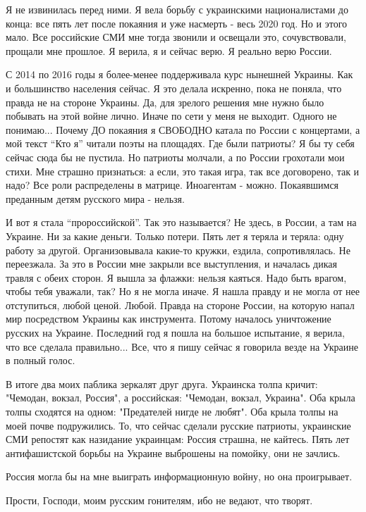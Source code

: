 Я не извинилась перед ними. Я вела борьбу с украинскими националистами до
конца: все пять лет после покаяния и уже насмерть - весь 2020 год. Но и этого
мало. Все российские СМИ мне тогда звонили и освещали это, сочувствовали,
прощали мне прошлое. Я верила, я и сейчас верю. Я реально верю России.

С 2014 по 2016 годы я более-менее поддерживала курс нынешней Украины. Как и
большинство населения сейчас. Я это делала искренно, пока не поняла, что правда
не на стороне Украины. Да, для зрелого решения мне нужно было побывать на этой
войне лично. Иначе по сети у меня не выходит. Одного не понимаю... Почему ДО
покаяния я СВОБОДНО катала по России с концертами, а мой текст \enquote{Кто я} читали
поэты на площадях. Где были патриоты? Я бы ту себя сейчас сюда бы не пустила.
Но патриоты молчали, а по России грохотали мои стихи. Мне страшно признаться: а
если, это такая игра, так все договорено, так и надо? Все роли распределены в
матрице. Иноагентам - можно. Покаявшимся преданным детям русского мира -
нельзя.

И вот я стала \enquote{пророссийской}. Так это называется? Не здесь, в России, а там на
Украине. Ни за какие деньги. Только потери. Пять лет я теряла и теряла: одну
работу за другой. Организовывала какие-то кружки, ездила, сопротивлялась. Не
переезжала. За это в России мне закрыли все выступления, и началась дикая
травля с обеих сторон. Я вышла за флажки: нельзя каяться. Надо быть врагом,
чтобы тебя уважали, так? Но я не могла иначе. Я нашла правду и не могла от нее
отступиться, любой ценой. Любой. Правда на стороне России, на которую напал мир
посредством Украины как инструмента. Потому началось уничтожение русских на
Украине. Последний год я пошла на большое испытание, я верила, что все сделала
правильно... Все, что я пишу сейчас я говорила везде на Украине в полный голос.

В итоге два моих паблика зеркалят друг друга. Украинска толпа кричит: "Чемодан,
вокзал, Россия", а российская: "Чемодан, вокзал, Украина". Оба крыла толпы
сходятся на одном: "Предателей нигде не любят". Оба крыла толпы на моей почве
подружились. То, что сейчас сделали русские патриоты, украинские СМИ репостят
как назидание украинцам: Россия страшна, не кайтесь. Пять лет антифашистской
борьбы на Украине выброшены на помойку, они не зачлись.

Россия могла бы на мне выиграть информационную войну, но она проигрывает.

Прости, Господи, моим русским гонителям, ибо не ведают, что творят.

